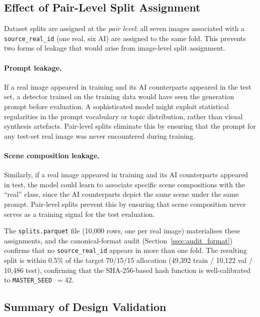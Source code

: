 \subsection{Effect of Pair-Level Split Assignment}
\label{ssec:abl_splits}

Dataset splits are assigned at the \emph{pair level}: all seven
images associated with a \texttt{source\_real\_id} (one real,
six AI) are assigned to the same fold.
This prevents two forms of leakage that would arise from
image-level split assignment.

\paragraph{Prompt leakage.}
If a real image appeared in training and its AI counterparts
appeared in the test set, a detector trained on the training data
would have seen the generation prompt before evaluation.
A sophisticated model might exploit statistical regularities in
the prompt vocabulary or topic distribution, rather than visual
synthesis artefacts.
Pair-level splits eliminate this by ensuring that the prompt for
any test-set real image was never encountered during training.

\paragraph{Scene composition leakage.}
Similarly, if a real image appeared in training and its AI
counterparts appeared in test, the model could learn to associate
specific scene compositions with the ``real'' class, since the
AI counterparts depict the same scene under the same prompt.
Pair-level splits prevent this by ensuring that scene composition
never serves as a training signal for the test evaluation.

The \texttt{splits.parquet} file (10{,}000 rows, one per real
image) materialises these assignments, and the canonical-format
audit (Section~\ref{ssec:audit_format}) confirms that no
\texttt{source\_real\_id} appears in more than one fold.
The resulting split is within 0.5\% of the target 70/15/15
allocation (49{,}392 train / 10{,}122 val / 10{,}486 test),
confirming that the SHA-256-based hash function is well-calibrated
to \texttt{MASTER\_SEED}~$= 42$.

\subsection{Summary of Design Validation}
\label{ssec:abl_summary}

